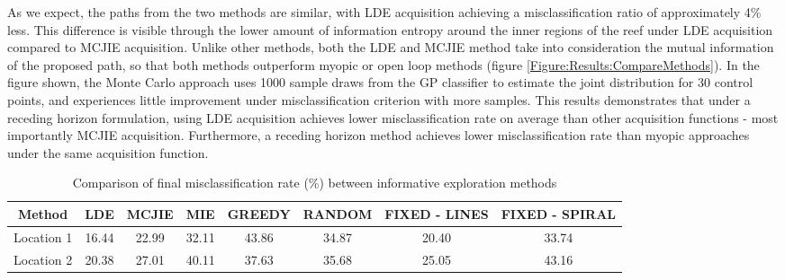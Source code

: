 \documentclass{article}
\begin{document}
		As we expect, the paths from the two methods are similar, with LDE acquisition achieving a misclassification ratio of approximately 4\% less. This difference is visible through the lower amount of information entropy around the inner regions of the reef under LDE acquisition compared to MCJIE acquisition. Unlike other methods, both the LDE and MCJIE method take into consideration the mutual information of the proposed path, so that both methods outperform myopic or open loop methods (figure \ref{Figure:Results:CompareMethods}). In the figure shown, the Monte Carlo approach uses 1000 sample draws from the GP classifier to estimate the joint distribution for 30 control points, and experiences little improvement under misclassification criterion with more samples. This results demonstrates that under a receding horizon formulation, using LDE acquisition achieves lower misclassification rate on average than other acquisition functions - most importantly MCJIE acquisition. Furthermore, a receding horizon method achieves lower misclassification rate than myopic approaches under the same acquisition function.	

		\begin{table}[t]
			\begin{center}
				\begin{tabular}{ |c||c|c|c|c|c|c|c| }
				\hline
				Method & LDE & MCJIE & MIE & GREEDY & RANDOM & FIXED - LINES & FIXED - SPIRAL \\
				\hline
				Location 1 & 16.44 & 22.99 & 32.11 & 43.86 & 34.87 & 20.40 & 33.74 \\
				Location 2 & 20.38 & 27.01 & 40.11 & 37.63 & 35.68 & 25.05 & 43.16 \\
				\hline
				\end{tabular}
			\end{center}
	  	\caption{Comparison of final misclassification rate (\%) between informative exploration methods}
	  	\label{Table:Results:CompareMethods}			
	  	\end{table}	
	  	
\end{document}

